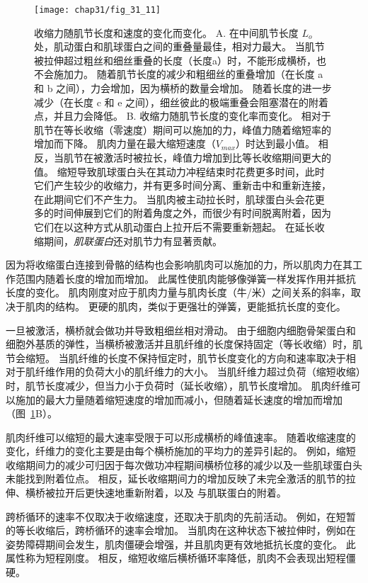 \begin{figure}[htbp]
	\centering
	\texttt{[image: chap31/fig\_31\_11]}
	\caption{收缩力随肌节长度和速度的变化而变化。
	A. 在中间肌节长度 $ L_o $ 处，肌动蛋白和肌球蛋白之间的重叠量最佳，相对力最大。
	当肌节被拉伸超过粗丝和细丝重叠的长度（长度a）时，不能形成横桥，也不会施加力。
	随着肌节长度的减少和粗细丝的重叠增加（在长度 a 和 b 之间），力会增加，因为横桥的数量会增加。
	随着长度的进一步减少（在长度 c 和 e 之间），细丝彼此的极端重叠会阻塞潜在的附着点，并且力会降低。
	B. 收缩力随肌节长度的变化率而变化。
	相对于肌节在等长收缩（零速度）期间可以施加的力，峰值力随着缩短率的增加而下降。
	肌肉力量在最大缩短速度（$ V_{max} $）时达到最小值。
	相反，当肌节在被激活时被拉长，峰值力增加到比等长收缩期间更大的值。
	缩短导致肌球蛋白头在其动力冲程结束时花费更多时间，此时它们产生较少的收缩力，并有更多时间分离、重新击中和重新连接，在此期间它们不产生力。
	当肌肉被主动拉长时，肌球蛋白头会花更多的时间伸展到它们的附着角度之外，而很少有时间脱离附着，因为它们在以这种方式从肌动蛋白上拉开后不需要重新翘起。
	在延长收缩期间，\textit{肌联蛋白}还对肌节力有显著贡献。}
	\label{fig:31_11}
\end{figure}


因为将收缩蛋白连接到骨骼的结构也会影响肌肉可以施加的力，所以肌肉力在其工作范围内随着长度的增加而增加。
此属性使肌肉能够像弹簧一样发挥作用并抵抗长度的变化。
肌肉刚度对应于肌肉力量与肌肉长度（牛/米）之间关系的斜率，取决于肌肉的结构。
更硬的肌肉，类似于更强壮的弹簧，更能抵抗长度的变化。


一旦被激活，横桥就会做功并导致粗细丝相对滑动。
由于细胞内细胞骨架蛋白和细胞外基质的弹性，当横桥被激活并且肌纤维的长度保持固定（等长收缩）时，肌节会缩短。
当肌纤维的长度不保持恒定时，肌节长度变化的方向和速率取决于相对于肌纤维作用的负荷大小的肌纤维力的大小。
当肌纤维力超过负荷（缩短收缩）时，肌节长度减少，但当力小于负荷时（延长收缩），肌节长度增加。
肌肉纤维可以施加的最大力量随着缩短速度的增加而减小，但随着延长速度的增加而增加（图~\ref{fig:31_11}B）。


肌肉纤维可以缩短的最大速率受限于可以形成横桥的峰值速率。
随着收缩速度的变化，纤维力的变化主要是由每个横桥施加的平均力的差异引起的。
例如，缩短收缩期间力的减少可归因于每次做功冲程期间横桥位移的减少以及一些肌球蛋白头未能找到附着位点。
相反，延长收缩期间力的增加反映了未完全激活的肌节的拉伸、横桥被拉开后更快速地重新附着，以及  与肌联蛋白的附着。


跨桥循环的速率不仅取决于收缩速度，还取决于肌肉的先前活动。
例如，在短暂的等长收缩后，跨桥循环的速率会增加。
当肌肉在这种状态下被拉伸时，例如在姿势障碍期间会发生，肌肉僵硬会增强，并且肌肉更有效地抵抗长度的变化。
此属性称为短程刚度。
相反，缩短收缩后横桥循环率降低，肌肉不会表现出短程僵硬。



